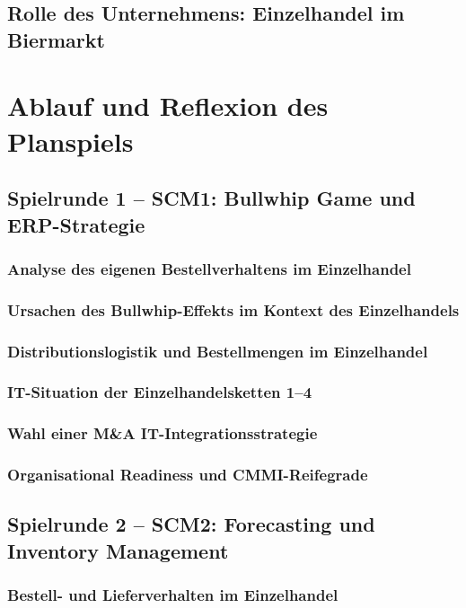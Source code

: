 \documentclass[a4paper,12pt]{article}
\begin{document}
\subsection{Rolle des Unternehmens: Einzelhandel im Biermarkt}

\section{Ablauf und Reflexion des Planspiels}

\subsection{Spielrunde 1 – SCM1: Bullwhip Game und ERP-Strategie}
\subsubsection{Analyse des eigenen Bestellverhaltens im Einzelhandel}
\subsubsection{Ursachen des Bullwhip-Effekts im Kontext des Einzelhandels}
\subsubsection{Distributionslogistik und Bestellmengen im Einzelhandel}
\subsubsection{IT-Situation der Einzelhandelsketten 1–4}
\subsubsection{Wahl einer M\&A IT-Integrationsstrategie}
\subsubsection{Organisational Readiness und CMMI-Reifegrade}

\subsection{Spielrunde 2 – SCM2: Forecasting und Inventory Management}
\subsubsection{Bestell- und Lieferverhalten im Einzelhandel}
\end{document}
